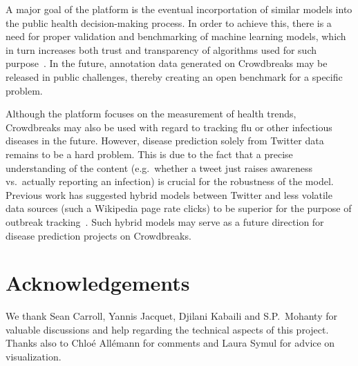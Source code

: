 \documentclass[a4paper, 11pt]{article}
\begin{document}
A major goal of the platform is the eventual incorportation of similar models into the public health decision-making process.
In order to achieve this, there is a need for proper validation and benchmarking of machine learning models, which in turn increases both trust and transparency of algorithms used for such purpose~\cite{salathe2018focus}.
In the future, annotation data generated on Crowdbreaks may be released in public challenges, thereby creating an open benchmark for a specific problem.\par

Although the platform focuses on the measurement of health trends, Crowdbreaks may also be used with regard to tracking flu or other infectious diseases in the future.
However, disease prediction solely from Twitter data remains to be a hard problem.
This is due to the fact that a precise understanding of the content (e.g.\ whether a tweet just raises awareness vs.\ actually reporting an infection) is crucial for the robustness of the model.
Previous work has suggested hybrid models between Twitter and less volatile data sources (such a Wikipedia page rate clicks) to be superior for the purpose of outbreak tracking~\cite{McIver2014,Santillana2015}.
Such hybrid models may serve as a future direction for disease prediction projects on Crowdbreaks. 

\section{Acknowledgements}
We thank Sean Carroll, Yannis Jacquet, Djilani Kabaili  and S.P.\ Mohanty for valuable discussions and help regarding the technical aspects of this project. Thanks also to Chlo\'e All\'emann for comments and Laura Symul for advice on visualization.



\end{document}
